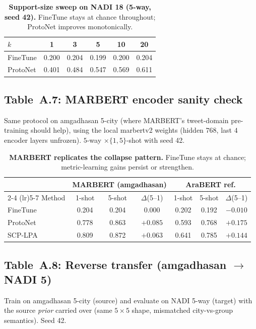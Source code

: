 \documentclass[11pt,a4paper]{article}
\begin{document}
\begin{table}[t]
\centering\scriptsize
\begin{tabular}{lccccc}
\toprule
$k$ & 1 & 3 & 5 & 10 & 20 \\
\midrule
FineTune  & 0.200 & 0.204 & 0.199 & 0.200 & 0.204 \\
ProtoNet  & 0.401 & 0.484 & 0.547 & 0.569 & 0.611 \\
\bottomrule
\end{tabular}
\caption{\textbf{Support-size sweep on NADI 18 (5-way, seed 42).}
FineTune stays at chance throughout; ProtoNet improves monotonically.}
\label{tab:A1-shotcurve}
\end{table}

\subsection{Table~A.7: MARBERT encoder sanity check}
Same protocol on amgadhasan 5-city (where MARBERT's tweet-domain
pre-training should help), using the local marbertv2 weights
(hidden $768$, last $4$ encoder layers unfrozen).
$5$-way $\times\{1,5\}$-shot with seed 42.

\begin{table}[t]
\centering\scriptsize
\begin{tabular}{lcccccc}
\toprule
& \multicolumn{3}{c}{MARBERT (amgadhasan)} & \multicolumn{3}{c}{AraBERT ref.} \\
\cmidrule(lr){2-4} \cmidrule(lr){5-7}
Method & 1-shot & 5-shot & $\Delta$(5--1) & 1-shot & 5-shot & $\Delta$(5--1) \\
\midrule
FineTune  & 0.204 & 0.204 & $0.000$ & 0.202 & 0.192 & $-0.010$ \\
ProtoNet  & 0.778 & 0.863 & $+0.085$ & 0.593 & 0.768 & $+0.175$ \\
SCP-LPA   & 0.809 & 0.872 & $+0.063$ & 0.641 & 0.785 & $+0.144$ \\
\bottomrule
\end{tabular}
\caption{\textbf{MARBERT replicates the collapse pattern.}
FineTune stays at chance; metric-learning gains persist or strengthen.}
\label{tab:A7-marbert}
\end{table}

\subsection{Table~A.8: Reverse transfer (amgadhasan $\to$ NADI 5)}
Train on amgadhasan 5-city (source) and evaluate on NADI 5-way
(target) with the source \emph{prior} carried over (same
$5{\times}5$ shape, mismatched city-vs-group semantics). Seed 42.
\end{document}
